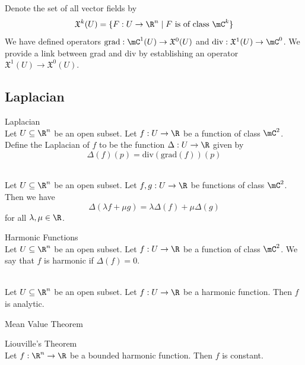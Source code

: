 \documentclass[a4paper]{article}
\begin{document}
Denote the set of all vector fields by $$\mathfrak{X}^k(U)=\{F:U\to\R^n\;|\;F\text{ is of class }\mC^k\}$$ We have defined operators $\text{grad}:\mC^1(U)\to\mathfrak{X}^0(U)$ and $\text{div}:\mathfrak{X}^1(U)\to\mC^0$. We provide a link between grad and div by establishing an operator $\mathfrak{X}^1(U)\to\mathfrak{X}^0(U)$. 

\subsection{Laplacian}
\begin{defn}{Laplacian}{}\\
Let $U\subseteq\R^n$ be an open subset. Let $f:U\to\R$ be a function of class $\mC^2$. Define the Laplacian of $f$ to be the function $\Delta:U\to\R$ given by $$\Delta(f)(p)=\text{div}(\text{grad}(f))(p)$$
\end{defn}

\begin{prp}{}{}\\
Let $U\subseteq\R^n$ be an open subset. Let $f,g:U\to\R$ be functions of class $\mC^2$. Then we have $$\Delta(\lambda f+\mu g)=\lambda\Delta(f)+\mu\Delta(g)$$ for all $\lambda,\mu\in\R$. 
\end{prp}

\begin{defn}{Harmonic Functions}{}\\
Let $U\subseteq\R^n$ be an open subset. Let $f:U\to\R$ be a function of class $\mC^2$. We say that $f$ is harmonic if $\Delta(f)=0$. 
\end{defn}

\begin{prp}{}{}\\
Let $U\subseteq\R^n$ be an open subset. Let $f:U\to\R$ be a harmonic function. Then $f$ is analytic. 
\end{prp}

\begin{thm}{Mean Value Theorem}{}
\end{thm}

\begin{thm}{Liouville's Theorem}{}\\
Let $f:\R^n\to\R$ be a bounded harmonic function. Then $f$ is constant. 
\end{thm}
\end{document}
